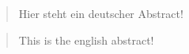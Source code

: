 \renewcommand\abstractname{\Large Acknowledgments}
\begin{abstract}


\end{abstract}

\renewcommand\abstractname{\Large Zusammenfassung}
\begin{abstract}								%
	\begin{otherlanguage}{ngerman}				%
		Hier steht ein deutscher Abstract!		
	\end{otherlanguage}						
\end{abstract}

\renewcommand\abstractname{\Large Abstract}
\begin{abstract}
	This is the english abstract!

\end{abstract}